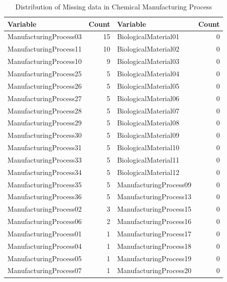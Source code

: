 \documentclass[]{report}
\begin{document}
\begin{table}[H]

\caption{\label{tab:kj-6.3b}Distribution of Missing data in Chemical Manufacturing Process}
\centering
\begin{tabular}[t]{l|r|l|r}
\hline
Variable & Count & Variable & Count\\
\hline
\rowcolor{gray!6}  ManufacturingProcess03 & 15 & BiologicalMaterial01 & 0\\
\hline
ManufacturingProcess11 & 10 & BiologicalMaterial02 & 0\\
\hline
\rowcolor{gray!6}  ManufacturingProcess10 & 9 & BiologicalMaterial03 & 0\\
\hline
ManufacturingProcess25 & 5 & BiologicalMaterial04 & 0\\
\hline
\rowcolor{gray!6}  ManufacturingProcess26 & 5 & BiologicalMaterial05 & 0\\
\hline
ManufacturingProcess27 & 5 & BiologicalMaterial06 & 0\\
\hline
\rowcolor{gray!6}  ManufacturingProcess28 & 5 & BiologicalMaterial07 & 0\\
\hline
ManufacturingProcess29 & 5 & BiologicalMaterial08 & 0\\
\hline
\rowcolor{gray!6}  ManufacturingProcess30 & 5 & BiologicalMaterial09 & 0\\
\hline
ManufacturingProcess31 & 5 & BiologicalMaterial10 & 0\\
\hline
\rowcolor{gray!6}  ManufacturingProcess33 & 5 & BiologicalMaterial11 & 0\\
\hline
ManufacturingProcess34 & 5 & BiologicalMaterial12 & 0\\
\hline
\rowcolor{gray!6}  ManufacturingProcess35 & 5 & ManufacturingProcess09 & 0\\
\hline
ManufacturingProcess36 & 5 & ManufacturingProcess13 & 0\\
\hline
\rowcolor{gray!6}  ManufacturingProcess02 & 3 & ManufacturingProcess15 & 0\\
\hline
ManufacturingProcess06 & 2 & ManufacturingProcess16 & 0\\
\hline
\rowcolor{gray!6}  ManufacturingProcess01 & 1 & ManufacturingProcess17 & 0\\
\hline
ManufacturingProcess04 & 1 & ManufacturingProcess18 & 0\\
\hline
\rowcolor{gray!6}  ManufacturingProcess05 & 1 & ManufacturingProcess19 & 0\\
\hline
ManufacturingProcess07 & 1 & ManufacturingProcess20 & 0\\

\end{tabular}
\end{table}
\end{document}
